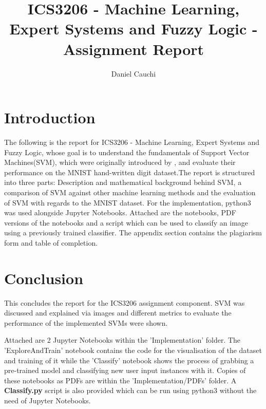 \documentclass{report}
\begin{document}
\title{ICS3206 - Machine Learning, Expert Systems and Fuzzy Logic - Assignment Report}
\author{Daniel Cauchi}
\date{}
\maketitle

\tableofcontents

\chapter{Introduction}
The following is the report for ICS3206 - Machine Learning, Expert Systems and Fuzzy Logic, whose goal is to understand the fundamentals of Support Vector Machines(SVM), which were originally introduced by \cite{vapnik}, and evaluate their performance on the MNIST hand-written digit dataset.The report is structured into three parts: Description and mathematical background behind SVM, a comparison of SVM against other machine learning methods and the evaluation of SVM with regards to the MNIST dataset. For the implementation, python3 was used alongside Jupyter Notebooks. Attached are the notebooks, PDF versions of the notebooks and a script which can be used to classify an image using a previously trained classifier. The appendix section contains the plagiarism form and table of completion.



\pagebreak

\pagebreak

\pagebreak

\chapter{Conclusion}
This concludes the report for the ICS3206 assignment component. SVM was discussed and explained via images and different metrics to evaluate the performance of the implemented SVMs were shown. 

Attached are 2 Jupyter Notebooks within the 'Implementation' folder. The 'ExploreAndTrain' notebook contains the code for the visualisation of the dataset and training of it while the 'Classify' notebook shows the process of grabbing a pre-trained model and classifying new user input instances with it. Copies of these notebooks as PDFs are within the 'Implementation/PDFs' folder. A \textbf{Classify.py} script is also provided which can be run using python3 without the need of Jupyter Notebooks.





\end{document}

